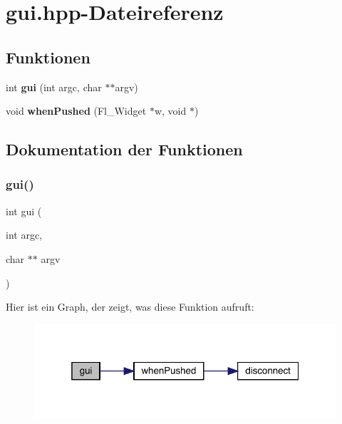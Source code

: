 \section{gui.\+hpp-\/\+Dateireferenz}
\label{gui_8hpp}
\subsection*{Funktionen}
\begin{DoxyCompactItemize}
\item 
int \textbf{ gui} (int argc, char $\ast$$\ast$argv)
\item 
void \textbf{ when\+Pushed} (Fl\+\_\+\+Widget $\ast$w, void $\ast$)
\end{DoxyCompactItemize}


\subsection{Dokumentation der Funktionen}
\mbox{\label{gui_8hpp_ace0698412b74cdbc0571809a0d903b49}} 
\subsubsection{gui()}
{\footnotesize\ttfamily int gui (\begin{DoxyParamCaption}\item[{int}]{argc,  }\item[{char $\ast$$\ast$}]{argv }\end{DoxyParamCaption})}

Hier ist ein Graph, der zeigt, was diese Funktion aufruft\+:\nopagebreak
\begin{figure}[H]
\begin{center}
\leavevmode
\includegraphics[width=319pt]{gui_8hpp_ace0698412b74cdbc0571809a0d903b49_cgraph}
\end{center}
\end{figure}
\mbox{\label{gui_8hpp_aa0976691d9932853389991b8459ebd85}} 
